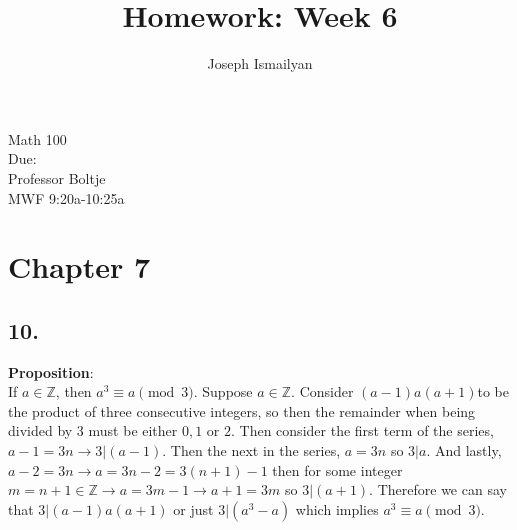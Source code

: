 \documentclass[12pt]{article}
\newcommand{\dueDate}{\formatdate{13}{11}{2017}} %
\newcommand{\hwNum}{6}
\begin{document}
	
\title{Homework: Week \hwNum}
\author{Joseph Ismailyan}
\date{}
\maketitle
\begin{flushleft}
Math 100 \\
Due: \dueDate \\ 
Professor Boltje \\
MWF 9:20a-10:25a
\end{flushleft}


\begin{minipage}[t]{0.40\textwidth}



\section*{Chapter 7}
\subsection*{10.}

\iffalse

\textbf{Proposition}:  \\If $ a\in \mathbb{Z} $, then $  a^3\equiv a\pmod{3}  $.
\newline\textit{Proof.} Suppose $ a\in \mathbb{Z} $. Consider $ (a-1)a(a+1) $. We can see that it is the product of three consecutive integers. It follows that \newline$ (a-1)a(a+1) =3!q, q\in \mathbb{Z}\newline =6q\newline=3(2q)\newline=3m, m=2q\in\mathbb{Z}.$ \newline Therefore $ 3|(a-1)a(a+1)\newline \rightarrow 3|(a^3-a)\rightarrow  a^3\equiv a\pmod{3}$.

\fi
\textbf{Proposition}:  \\If $ a\in \mathbb{Z} $, then $  a^3\equiv a\pmod{3}  $.
 Suppose $ a\in \mathbb{Z} $. Consider $ (a-1)a(a+1) $to be the product of three consecutive integers, so then the remainder when being divided by $ 3 $ must be either $ 0,1 \text{ or } 2 $. Then consider the first term of the series, $ a-1=3n \rightarrow 3|(a-1) $. Then the next in the series, $ a=3n $ so $ 3|a $. And lastly,  $ a-2=3n \rightarrow a=3n-2=3(n+1)-1 $ then for some integer $ m=n+1\in\mathbb{Z} \rightarrow a=3m-1\rightarrow a+1=3m$ so $ 3|(a+1) $. Therefore we can say that $ 3|(a-1)a(a+1) $ or just $ 3|(a^3-a) $ which implies $ a^3\equiv a\pmod{3} $.     

\end{minipage}
\end{document}
